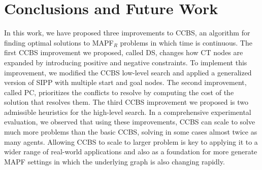 \documentclass[letterpaper]{article} %
\newcommand{\ccbs}{\ac{CCBS}\xspace}
\newcommand{\ct}{\ac{CT}\xspace}
\newcommand{\sipp}{\ac{SIPP}\xspace}
\newcommand{\mapfr}{{MAPF}$_R$\xspace}
\newcommand{\mapf}{\ac{MAPF}\xspace}
\newcommand{\pc}{\ac{PC}\xspace}
\newcommand{\ds}{\ac{DS}\xspace}
\begin{document}
\section{Conclusions and Future Work}
In this work, we have proposed three improvements to \ccbs, an algorithm for finding optimal solutions to \mapfr problems in which time is continuous. 
The first \ccbs improvement we proposed, called \ds, changes how \ct nodes are expanded by introducing positive and negative constraints. 
To implement this improvement, we modified the \ccbs low-level search and applied a generalized version of \sipp with multiple start and goal nodes. 
The second improvement, called \pc, prioritizes the conflicts to resolve by computing the cost of the solution that resolves them. 
The third \ccbs improvement we proposed is two admissible heuristics for the high-level search. 
In a comprehensive experimental evaluation, we observed that using these improvements, \ccbs can scale to solve much more problems than the basic \ccbs, solving in some cases almost twice as many agents. 
Allowing \ccbs to scale to larger problem is key to applying it to a wider range of real-world applications and also as a foundation for more generate \mapf settings in which the underlying graph is also changing rapidly. 




\end{document}
